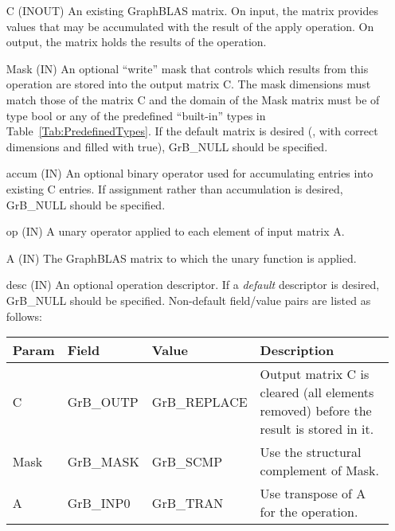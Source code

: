 \begin{itemize}[leftmargin=1.1in]
    \item[{\sf C}]    ({\sf INOUT}) An existing GraphBLAS matrix. On input,
    the matrix provides values that may be accumulated with the result of the
    apply operation.  On output, the matrix holds the results of the
    operation.

    \item[{\sf Mask}] ({\sf IN}) An optional ``write'' mask that controls which
    results from this operation are stored into the output matrix {\sf C}. The 
    mask dimensions must match those of the matrix {\sf C} and the domain of the 
    {\sf Mask} matrix must be of type {\sf bool} or any of the predefined 
    ``built-in'' types in Table~\ref{Tab:PredefinedTypes}.  If the default
    matrix is desired (\ie, with correct dimensions and filled with {\sf true}), 
    {\sf GrB\_NULL} should be specified.

    \item[{\sf accum}] ({\sf IN}) An optional binary operator used for accumulating
    entries into existing {\sf C} entries.
    If assignment rather than accumulation is
    desired, {\sf GrB\_NULL} should be specified.

    \item[{\sf op}] ({\sf IN}) A unary operator applied to each
	    element of input matrix {\sf A}.

    \item[{\sf A}]     ({\sf IN})  The GraphBLAS matrix to which the unary function 
    is applied.

    \item[{\sf desc}] ({\sf IN}) An optional operation descriptor. If
    a \emph{default} descriptor is desired, {\sf GrB\_NULL} should be
    specified. Non-default field/value pairs are listed as follows:  \\

    \begin{tabular}{lllp{2.5in}}
        Param & Field  & Value & Description \\
        \hline
        {\sf C}    & {\sf GrB\_OUTP} & {\sf GrB\_REPLACE} & Output matrix {\sf C}
        is cleared (all elements removed) before the result is stored in it.\\

        {\sf Mask} & {\sf GrB\_MASK} & {\sf GrB\_SCMP}   & Use the structural
        complement of {\sf Mask}. \\

        {\sf A}    & {\sf GrB\_INP0} & {\sf GrB\_TRAN}   & Use transpose of {\sf A}
        for the operation. \\
    \end{tabular}
\end{itemize}

